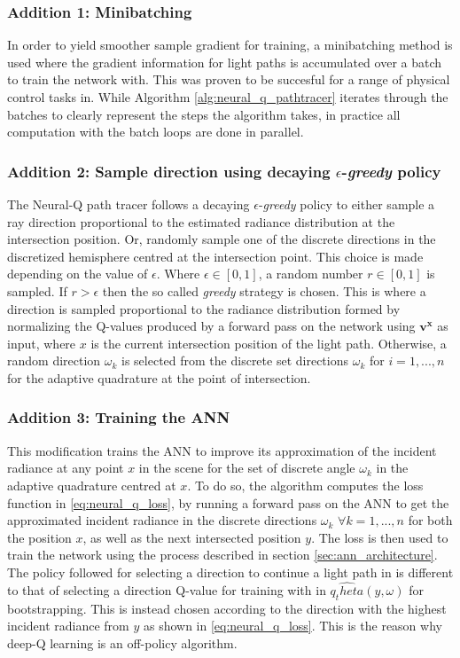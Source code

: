 \documentclass[../dissertation.tex]{subfiles}
\begin{document}
\subsubsection*{Addition 1: Minibatching}
In order to yield smoother sample gradient for training, a minibatching method is used where the gradient information for light paths is accumulated over a batch to train the network with. This was proven to be succesful for a range of physical control tasks in\cite{lillicrap2015continuous}. While Algorithm \ref{alg:neural_q_pathtracer} iterates through the batches to clearly represent the steps the algorithm takes, in practice all computation with the batch loops are done in parallel. 

\subsubsection*{Addition 2: Sample direction using decaying $\epsilon$-\textit{greedy} policy}
The Neural-Q path tracer follows a decaying $\epsilon$-\textit{greedy} policy to either sample a ray direction proportional to the estimated radiance distribution at the intersection position. Or, randomly sample one of the discrete directions in the discretized hemisphere centred at the intersection point. This choice is made depending on the value of $\epsilon$. Where $\epsilon \in [0,1]$, a random number $r \in [0,1]$ is sampled. If $r > \epsilon$ then the so called \textit{greedy} strategy is chosen. This is where a direction is sampled proportional to the radiance distribution formed by normalizing the Q-values produced by a forward pass on the network using $\mathbf{v^x}$ as input, where $x$ is the current intersection position of the light path. Otherwise, a random direction $\omega_k$ is selected from the discrete set directions $\omega_k$ for $i = 1,...,n$ for the adaptive quadrature at the point of intersection. 

\subsubsection*{Addition 3: Training the ANN}
This modification trains the ANN to improve its approximation of the incident radiance at any point $x$ in the scene for the set of discrete angle $\omega_k$ in the adaptive quadrature centred at $x$. To do so, the algorithm computes the loss function in \ref{eq:neural_q_loss}, by running a forward pass on the ANN to get the approximated incident radiance in the discrete directions $\omega_k$ $\forall k=1,...,n$ for both the position $x$, as well as the next intersected position $y$. The loss is then used to train the network using the process described in section \ref{sec:ann_architecture}. The policy followed for selecting a direction to continue a light path in is different to that of selecting a direction Q-value for training with in $\hat{q_theta}(y, \omega)$ for bootstrapping. This is instead chosen according to the direction with the highest incident radiance from $y$ as shown in \ref{eq:neural_q_loss}. This is the reason why deep-Q learning is an off-policy algorithm.\\ 
\end{document}
